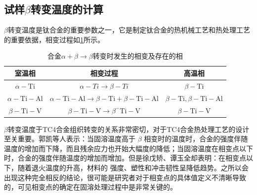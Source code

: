 %

\subsection{试样$\beta$转变温度的计算}
$\beta$转变温度是钛合金的重要参数之一，它是制定钛合金的热机械工艺和热处理工艺的重要依据，相变过程如\ref{sec:Tc4betachange}所示。

\begin{table}[htbp]
	\centering
	\caption{\ti 合金$ \alpha+\beta \to \beta $转变时发生的相变及存在的相}
	\label{sec:Tc4betachange}
	\begin{tabular}{ccc}
		\toprule 室温相 & 相变过程 & 高温相 \\
		\midrule$\alpha-\mathrm{Ti}$ & $\alpha-T i \rightarrow \beta-T i$ & $\beta-\mathrm{Ti}$ \\
		$\alpha-\mathrm{Ti}-\mathrm{Al}$ & $\alpha-\mathrm{Ti}-\mathrm{Al} \rightarrow \beta-\mathrm{Ti}+\beta-\mathrm{Ti}-\mathrm{Al}$ & $\beta-\mathrm{Ti}, \beta-\mathrm{Ti}-\mathrm{Al}$ \\
		$\beta- \mathrm{Ti}-\mathrm{V}$ & $\beta-\mathrm{Ti}-\mathrm{V} \rightarrow \beta^{-} \mathrm{Ti}-\mathrm{V}$ & $\beta-\mathrm{Ti}-\mathrm{V}$ \\
		\bottomrule
	\end{tabular}
\end{table}

$\beta$转变温度于TC4合金组织转变的关系非常密切，对于TC4合金热处理工艺的设计至关重要。郭凯\cite{guokaiTC4taihejinrechuligongyideyanjiuxianzhuangjijinzhan2021}等人表示：当固溶温度高于 $\beta$ 相变时的温度时，合金的强度伴随温度的增加而下降，而且残余应力也开始大幅度的降低；当固溶温度在相变点以下时，合金的强度伴随温度的增加而增加。但是徐戊矫、谭玉全\cite{xujianGurongshixiaogongyiduiTC4taihejinzuzhijixingnengdeyingxiang2014}却表明：在相变点以下，随着退火温度的升高，材料的 强度、塑性和冲击韧性呈降低趋势。之所以会出现这种完全相反的结论，很可能是研究者对于相变点的具体值定义不清晰导致的，可见相变点的确定在固溶处理过程中是非常关键的。


